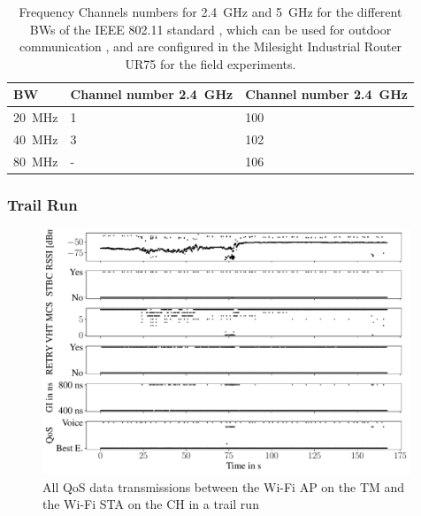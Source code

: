 \begin{table}[H]
	\centering
	\begin{tabular}{>{\centering}p{2cm}p{4cm}p{4cm}}
		\toprule
		\ac{BW} & Channel number \SI{2.4}{\giga\hertz} & Channel number \SI{2.4}{\giga\hertz}\\
		\midrule
		\SI{20}{\mega\hertz} & \num{1}&
		\num{100} \\
		\SI{40}{\mega\hertz} &
		\num{3}
		& \num{102} \\
		\SI{80}{\mega\hertz} &
		- & \num{106} \\
		\bottomrule
	\end{tabular}
	\caption{Frequency Channels numbers for \SI{2.4}{\giga\hertz} and \SI{5}{\giga\hertz} for the different \acf{BW}s of the IEEE 802.11 standard \cite{noauthor_ieee_2021-1}, which can be used for
	outdoor communication \cite{freq_plan_24G}, \cite{freq_plan_5G} and are configured in the Milesight Industrial Router UR75 for
	the field experiments.}
	\label{tab:fieldChannels}
\end{table}

\subsubsection*{Trail Run}

\begin{figure}[H]%
	\centering
	\includegraphics[width=0.98\textwidth]{figures/wireless5}
	\caption{All QoS data transmissions between the Wi-Fi \acf{AP} on the \acf{TM} and the Wi-Fi \ac{STA} on the \acf{CH} in a trail run}
	\label{fig:trailrunAll}%
\end{figure}

